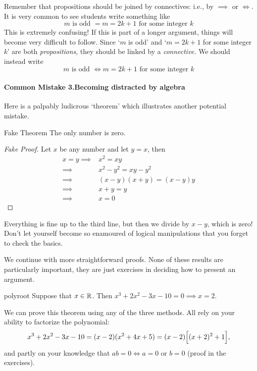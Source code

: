 Remember that propositions should be joined by connectives: i.e., by $\implies$ or $\iff$. It is very common to see students write something like
\[\text{$m$ is odd $=m=2k+1$ for some integer $k$}\]
This is extremely confusing! If this is part of a longer argument, things will become very difficult to follow. Since `$m$ is odd' and `$m=2k+1$ for some integer $k$' are both \emph{propositions,} they should be linked by a \emph{connective.} We should instead write
\[\text{$m$ is odd $\iff m=2k+1$ for some integer $k$}\]

\paragraph{Common Mistake 3.\quad Becoming distracted by algebra}

Here is a palpably ludicrous `theorem' which illustrates another potential mistake.

\begin{thm*}{Fake Theorem}{}
The only number is zero.
\end{thm*}

\begin{proof}[Fake Proof]
Let $x$ be any number and let $y=x$, then
\begin{align*}
x=y\implies &x^2=xy\tag*{(Multiply both sides by $x$)}\\
\implies &x^2-y^2=xy-y^2\tag*{(Subtract $y^2$ from both sides)}\\
\implies &(x-y)(x+y)=(x-y)y\tag*{(Factorize)}\\
\implies &x+y=y\tag*{(Divide both sides by $x-y$)}\\
\implies &x=0 \tag*{\qedhere}
\end{align*}
\end{proof}

 Everything is fine up to the third line, but then we divide by $x-y$, which is zero! Don't let yourself become so enamoured of logical manipulations that you forget to check the basics.



We continue with more straightforward proofs. None of these results are particularly important, they are just exercises in deciding how to present an argument.

\begin{thm}{}{polyroot}
Suppose that $x\in\mathbb{R}$. Then $x^3+2x^2-3x-10=0\implies x=2$.
\end{thm}

 We can prove this theorem using any of the three methods. All rely on your ability to factorize the polynomial:
\[x^3+2x^2-3x-10=(x-2)(x^2+4x+5)=(x-2)\Bigl[(x+2)^2+1\Bigr],\]
and partly on your knowledge that $ab=0\iff a=0$ or $b=0$ (proof in the exercises).

